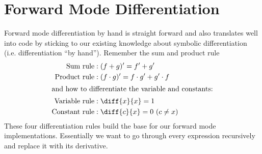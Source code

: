 \chapter{Forward Mode Differentiation} \label{sec:forwardMode}

Forward mode differentiation by hand is straight forward and also translates well into code by sticking to our existing knowledge about symbolic differentiation (i.e. differentiation ``by hand''). Remember the sum and product rule
\begin{align*}
    \text{Sum rule}&: (f + g)' = f' + g' \\
    \text{Product rule}&: (f \cdot g)' = f \cdot g' + g' \cdot f \\
\intertext{and how to differentiate the variable and constants:}
    \text{Variable rule}&: \diff{x}{x} = 1 \\
    \text{Constant rule}&: \diff{c}{x} = 0\ (c \neq x) \\
\end{align*}
These four differentiation rules build the base for our forward mode implementations. Essentially we want to go through every expression recursively and replace it with its derivative.


